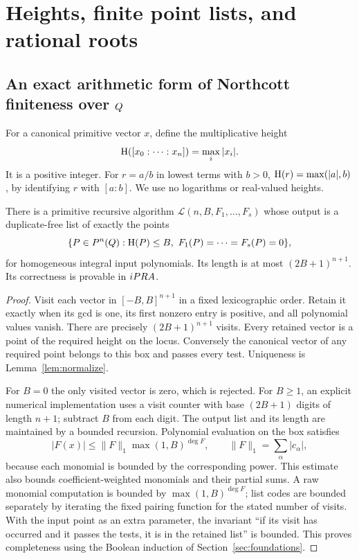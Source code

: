 \section{Heights, finite point lists, and rational roots}
\label{sec:heights}

\subsection{An exact arithmetic form of Northcott finiteness over \texorpdfstring{$Q$}{Q}}

For a canonical primitive vector $x$, define the multiplicative height
\[
                 \mathrm H([x_0:\cdots:x_n])=\max_i |x_i|.
\]
It is a positive integer. For $r=a/b$ in lowest terms with $b>0$,
$\mathrm H(r)=\max(|a|,b)$, by identifying $r$ with $[a:b]$.
We use no logarithms or real-valued heights.

\begin{theorem}\label{thm:northcott}
There is a primitive recursive algorithm $\mathcal L(n,B,F_1,\ldots,F_s)$
whose output is a duplicate-free list of exactly the points
\[
 \{P\in\PP^n(\Q):\Ht(P)\le B,\ F_1(P)=\cdots=F_s(P)=0\},
\]
for homogeneous integral input polynomials. Its length is at most
$(2B+1)^{n+1}$. Its correctness is provable in $iPRA$.
\end{theorem}
\begin{proof}
Visit each vector in $[-B,B]^{n+1}$ in a fixed lexicographic order. Retain
it exactly when its gcd is one, its first nonzero entry is positive, and all
polynomial values vanish. There are precisely $(2B+1)^{n+1}$ visits. Every
retained vector is a point of the required height on the locus. Conversely
the canonical vector of any required point belongs to this box and passes
every test. Uniqueness is Lemma~\ref{lem:normalize}.

For $B=0$ the only visited vector is zero, which is rejected. For $B\ge1$,
an explicit numerical implementation uses a visit counter with base
$(2B+1)$ digits of length $n+1$; subtract $B$ from each digit. The output
list and its length are maintained by a bounded recursion. Polynomial
evaluation on the box satisfies
\[
    |F(x)|\le \|F\|_1\max(1,B)^{\deg F},\qquad
    \|F\|_1=\sum_{\alpha}|c_\alpha|,
\]
because each monomial is bounded by the corresponding power. This estimate
also bounds coefficient-weighted monomials and their partial sums. A raw
monomial computation is bounded by $\max(1,B)^{\deg F}$; list codes are
bounded separately by iterating the fixed pairing function for the stated
number of visits. With the input point as an extra parameter,
the invariant ``if its visit has occurred and it passes the tests, it is in
the retained list'' is bounded. This proves completeness using the Boolean
induction of Section~\ref{sec:foundations}.
\end{proof}

